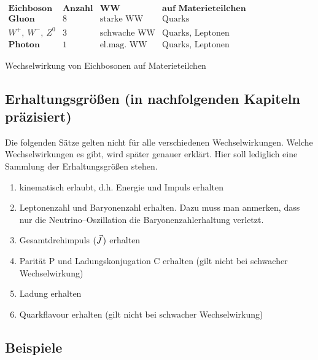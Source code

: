 \documentclass[Ex4_Zusammenfassung.tex]{subfiles}
\begin{document}
\begin{table}[H]
	\centering
	$
	\begin{array}{c|ccc}
		\textbf{Eichboson} & \textbf{Anzahl} & \textbf{WW} & \textbf{auf Materieteilchen} \\
		\hline
		\textbf{Gluon} & 8 & \text{starke WW} & \text{Quarks} \\ 
		W^+,\ W^-,\ Z^0 & 3 & \text{schwache WW} & \text{Quarks, Leptonen} \\ 
		\textbf{Photon} & 1 & \text{el.mag. WW} & \text{Quarks, Leptonen}
	\end{array} 
	$
	\caption{Wechselwirkung von Eichbosonen auf Materieteilchen}
\end{table}

\subsection{Erhaltungsgrößen (in nachfolgenden Kapiteln präzisiert)}
Die folgenden Sätze gelten nicht für alle verschiedenen Wechselwirkungen. Welche Wechselwirkungen es gibt, wird später genauer erklärt. Hier soll lediglich eine Sammlung der Erhaltungsgrößen stehen. 

\begin{enumerate}
	\item kinematisch erlaubt, d.h. Energie und Impuls erhalten
	
	\item Leptonenzahl und Baryonenzahl erhalten. Dazu muss man anmerken, dass nur die Neutrino--Oszillation die Baryonenzahlerhaltung verletzt.
	
	\item Gesamtdrehimpuls $(\pvec{J})$ erhalten
	
	\item Parität P und Ladungskonjugation C erhalten (gilt nicht bei schwacher Wechselwirkung)
	
	\item Ladung erhalten
	
	\item Quarkflavour erhalten (gilt nicht bei schwacher Wechselwirkung)
\end{enumerate}

\subsection{Beispiele}
	
\end{document}

